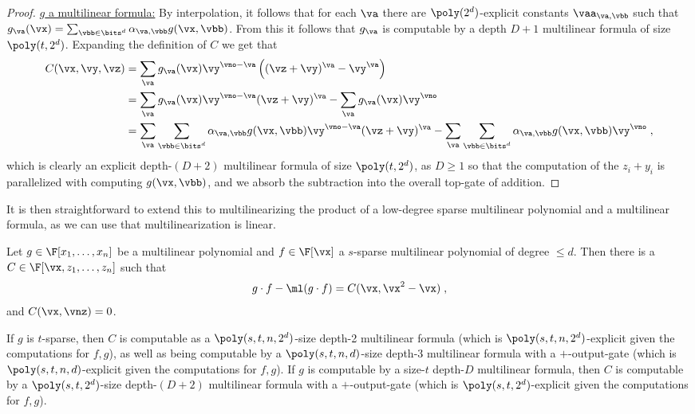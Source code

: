 \documentclass[11pt]{article}
\numberwithin{equation}{section}
\theoremstyle{definition}
\theoremstyle{plain}
\begin{document}
\begin{proof}
        \uline{$g$ a multilinear formula:} By interpolation, it follows that for each $\va$ there are $\poly(2^d)$-explicit constants $\vaa_{\va,\vbb}$ such that $g_\va(\vx)=\sum_{\vbb\in\bits^d} \alpha_{\va,\vbb}g(\vx,\vbb)$.  From this it follows that $g_\va$ is computable by a depth $D+1$ multilinear formula of size $\poly(t,2^d)$.  Expanding the definition of $C$ we get that
        \begin{align*}
                C(\vx,\vy,\vz)
                &=\sum_{\va} g_\va(\vx)\vy^{\vno-\va}\left((\vz+\vy)^\va-\vy^{\va}\right)\\
                &=\sum_{\va} g_\va(\vx)\vy^{\vno-\va}(\vz+\vy)^\va
                        -\sum_{\va} g_\va(\vx)\vy^\vno\\
                &=\sum_{\va} \sum_{\vbb\in\bits^d} \alpha_{\va,\vbb}g(\vx,\vbb)\vy^{\vno-\va}(\vz+\vy)^\va
                        -\sum_{\va} \sum_{\vbb\in\bits^d} \alpha_{\va,\vbb}g(\vx,\vbb)\vy^\vno
                \;,
        \end{align*}
        which is clearly an explicit
%
depth-$(D+2)$   %
multilinear formula of size $\poly(t,2^d)$, as $D\ge 1$ so that the computation of the $z_i+y_i$ is parallelized with computing $g(\vx,\vbb)$, and we absorb the subtraction into the overall top-gate of addition.
\end{proof}

%
%
It is then straightforward to  %
extend this to multilinearizing the product of a low-degree sparse multilinear polynomial and a multilinear formula, as we can use that multilinearization is linear.

\begin{corollarywp}\label{res:multilin:sparse_formula}
        Let $g\in\F[x_1,\ldots,x_n]$ be a multilinear polynomial and $f\in\F[\vx]$ a $s$-sparse multilinear polynomial of degree $\le d$. Then there is a $C\in\F[\vx,z_1,\ldots,z_n]$ such that
        \[
                g\cdot f-\ml(g\cdot f)
                =C(\vx,\vx^2-\vx)
                \;,
        \]
        and $C(\vx,\vnz)=0$.

        If $g$ is $t$-sparse, then $C$ is computable as a $\poly(s,t,n,2^d)$-size depth-2 multilinear formula (which is $\poly(s,t,n,2^d)$-explicit given the computations for $f,g$), as well as being computable by a $\poly(s,t,n,d)$-size depth-3 multilinear formula with a $+$-output-gate (which is $\poly(s,t,n,d)$-explicit given the computations for $f,g$).  If $g$ is computable by a size-$t$ depth-$D$ multilinear formula, then $C$ is computable by a $\poly(s,t,2^d)$-size depth-$(D+2)$ multilinear formula with a $+$-output-gate (which is $\poly(s,t,2^d)$-explicit given the computations for $f,g$).
\end{corollarywp}
\end{document}
